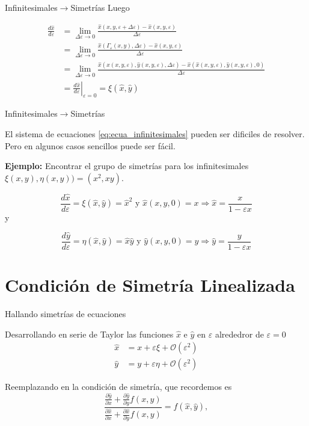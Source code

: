 \documentclass[handout,hyperref={colorlinks=true}]{beamer}
\renewcommand{\emph}[1]{\textcolor[rgb]{1,0,0}{#1}}
\renewcommand{\epsilon}{\varepsilon}
\newcommand{\nl}{\onslide<+-> }
\begin{document}
\begin{frame}{Infinitesimales$\to$Simetrías}
Luego

\[
\begin{split}
\frac{d\hat{x}}{d\epsilon}&=\lim_{\Delta\epsilon\to 0}\frac{\hat{x}(x,y,\epsilon+\Delta\epsilon)-\hat{x}(x,y,\epsilon)  }{\Delta\epsilon}\\
&=\lim_{\Delta\epsilon\to 0}\frac{\hat{x}(\Gamma_{\epsilon}(x,y),\Delta\epsilon)  -\hat{x}(x,y,\epsilon)  }{\Delta\epsilon}\\
&=\lim_{\Delta\epsilon\to 0}\frac{\hat{x}(\hat{x}(x,y,\epsilon),\hat{y}(x,y,\epsilon),\Delta\epsilon)  -\hat{x}(\hat{x}(x,y,\epsilon),\hat{y}(x,y,\epsilon),0)  }{\Delta\epsilon}\\
&=\left.\frac{d\hat{x}}{d\epsilon}\right|_{\epsilon=0}=\xi(\hat{x},\hat{y})
\end{split}
\]

\end{frame}
\begin{frame}{Infinitesimales$\to$Simetrías}

El \emph{sistema de ecuaciones} \eqref{eq:ecua_infinitesimales}    pueden ser dificiles de resolver. Pero en algunos casos sencillos puede ser fácil.

\nl \textbf{Ejemplo:} Encontrar el grupo de simetrías para los infinitesimales $\xi(x,y),\eta(x,y))=(x^2,xy)$.


\[ \frac{d\hat{x}}{d\epsilon}=\xi(\hat{x},\hat{y})=\hat{x}^2\text{ y }\hat{x}(x,y,0)=x
\Rightarrow \hat{x}=\frac{x}{1-\epsilon x}\]
y

\[ \frac{d\hat{y}}{d\epsilon}=\eta(\hat{x},\hat{y})=\hat{x}\hat{y}\text{ y }\hat{y}(x,y,0)=y
\Rightarrow \hat{y}=\frac{y}{1-\epsilon x}\]



\end{frame}





\section{Condición de Simetría Linealizada}
\begin{frame}{Hallando simetrías de ecuaciones}


Desarrollando en serie de Taylor las funciones $\hat{x}$ e $\hat{y}$ en $\epsilon$ alrededror de $\epsilon=0$
\[
 \begin{split}
  \hat{x}&=x+\epsilon\xi+\mathcal{O}(\epsilon^2)\\
  \hat{y}&=y+\epsilon\eta+\mathcal{O}(\epsilon^2)
  \end{split}
\]

Reemplazando en la condición de simetría, que recordemos es
\[\frac{\frac{\partial\hat{y}}{\partial x}+\frac{\partial\hat{y}}{\partial y}
 f(x,y)}{\frac{\partial\hat{x}}{\partial x}+\frac{\partial\hat{x}}{\partial y}f(x,y)}
 =f(\hat{x},\hat{y}),
\]

\end{frame}
\end{document}
